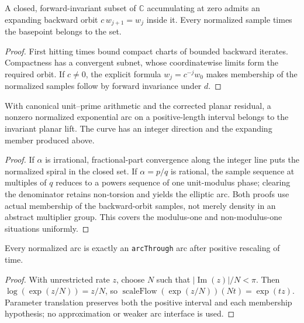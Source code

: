 \begin{lemma}
  \label{lem:backward-orbit}
  \leanok
  A closed, forward-invariant subset of \(\mathbb C\) accumulating at zero
  admits an expanding backward orbit \(c\,w_{j+1}=w_j\) inside it. Every
  normalized sample times the basepoint belongs to the set.
\end{lemma}
\begin{proof}
  First hitting times bound compact charts of bounded backward iterates.
  Compactness has a convergent subnet, whose coordinatewise limits form the
  required orbit. If \(c\neq0\), the explicit formula \(w_j=c^{-j}w_0\) makes
  membership of the normalized samples follow by forward invariance under \(d\).
\end{proof}

\begin{theorem}
  \label{thm:normalized-arc}
  \leanok
  With canonical unit--prime arithmetic and the corrected planar residual, a
  nonzero normalized exponential arc on a positive-length interval belongs to
  the invariant planar lift. The curve has an integer direction and the expanding
  member produced above.
\end{theorem}
\begin{proof}
  If \(\alpha\) is irrational, fractional-part convergence along the integer
  line puts the normalized spiral in the closed set. If \(\alpha=p/q\) is
  rational, the sample sequence at multiples of \(q\) reduces to a powers
  sequence of one unit-modulus phase; clearing the denominator retains
  non-torsion and yields the elliptic arc. Both proofs use actual membership of
  the backward-orbit samples, not merely density in an abstract multiplier
  group. This covers the modulus-one and non-modulus-one situations uniformly.
\end{proof}

\begin{theorem}
  \label{thm:arc-through}
  \leanok
  Every normalized arc is exactly an \texttt{arcThrough} arc after positive
  rescaling of time.
\end{theorem}
\begin{proof}
  With unrestricted rate \(z\), choose \(N\) such that
  \(|\operatorname{Im}(z)|/N<\pi\). Then
  \(\log(\exp(z/N))=z/N\), so
  \(\operatorname{scaleFlow}(\exp(z/N))(Nt)=\exp(tz)\). Parameter translation
  preserves both the positive interval and each membership hypothesis; no
  approximation or weaker arc interface is used.
\end{proof}

